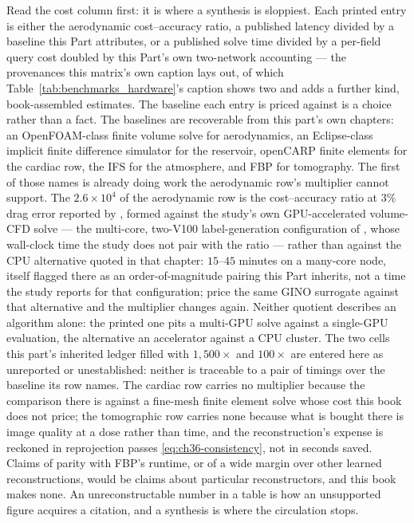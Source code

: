 Read the cost column first: it is where a synthesis is sloppiest. Each printed
entry is either the aerodynamic cost--accuracy ratio, a published latency divided by
a baseline this Part attributes, or a published solve time divided by a per-field query
cost doubled by this Part's own two-network accounting --- the
provenances this matrix's own caption lays out, of which Table~\ref{tab:benchmarks_hardware}'s caption shows two and adds a further kind, book-assembled estimates. The
baseline each entry is priced against is a choice rather than a
fact. The baselines are recoverable from this part's own chapters: an OpenFOAM-class finite
volume solve for aerodynamics, an Eclipse-class implicit finite difference simulator for the
reservoir, openCARP finite elements for the cardiac row, the IFS for the atmosphere, and FBP
for tomography. The first of those names is already doing work the aerodynamic row's multiplier cannot support. The
$2.6\times10^{4}$ of the aerodynamic row is the cost--accuracy ratio at $3\%$ drag error
reported by \cite{li2023geometry}, formed against the study's own GPU-accelerated
volume-CFD solve --- the multi-core, two-V100 label-generation configuration of
, whose wall-clock time the study
does not pair with the ratio --- rather than against the CPU alternative quoted in that
chapter: $15$--$45$ minutes on a many-core node, itself flagged there as an
order-of-magnitude pairing this Part inherits, not a time the study reports for that
configuration; price the same GINO surrogate against that alternative and the multiplier
changes again. Neither quotient describes an algorithm alone: the
printed one pits a multi-GPU solve against a single-GPU evaluation, the alternative an
accelerator against a CPU cluster.
The two cells this part's inherited ledger filled with $1{,}500\times$ and $100\times$
are entered here as unreported or unestablished: neither is traceable to a pair of timings over the
baseline its row names. The cardiac row carries no multiplier because the comparison
there is against a fine-mesh finite element solve whose cost this book does not price;
the tomographic row carries none because what is bought there is image quality at a
dose rather than time, and the reconstruction's expense is reckoned in reprojection
passes \eqref{eq:ch36-consistency}, not in seconds saved. Claims of parity with FBP's
runtime, or of a wide margin over other learned reconstructions, would be claims about
particular reconstructors, and this book makes none. An unreconstructable number in a table is how an
unsupported figure acquires a citation, and a synthesis is where the circulation stops.

